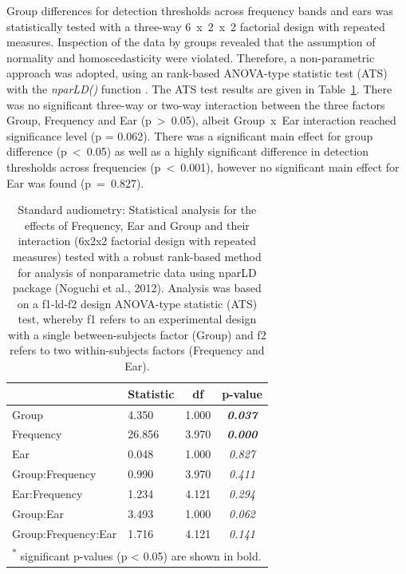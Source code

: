 \documentclass[a4paper, twoside]{templates/ociamthesis}
\begin{document}
Group differences for detection thresholds across frequency bands and ears was statistically tested with a three-way 6~x~2~x~2 factorial design with repeated measures. Inspection of the data by groups revealed that the assumption of normality and homoscedasticity were violated. Therefore, a non-parametric approach was adopted, using an rank-based ANOVA-type statistic test (ATS) with the \emph{nparLD()} function \autocite[nparLD package;][]{nparLDPackageR}. The ATS test results are given in Table~\ref{tab:RegAud-TabnparLD}. There was no significant three-way or two-way interaction between the three factors Group, Frequency and Ear (p~\textgreater~0.05), albeit Group~x~Ear interaction reached significance level (p = 0.062). There was a significant main effect for group difference (p~\textless~0.05) as well as a highly significant difference in detection thresholds across frequencies (p~\textless~0.001), however no significant main effect for Ear was found (p~=~0.827).\\

\begin{table}

\caption{\label{tab:RegAud-TabnparLD}Standard audiometry: Statistical analysis for the effects of Frequency, Ear and Group and their interaction (6x2x2 factorial design with repeated measures) tested with a robust rank-based method for analysis of nonparametric data using nparLD package (Noguchi et al., 2012). Analysis was based on a f1-ld-f2 design ANOVA-type statistic (ATS) test, whereby f1 refers to an experimental design with a single between-subjects factor (Group) and f2 refers to two within-subjects factors (Frequency and Ear).}
\centering
\begin{tabular}[t]{llc>{}c}
\toprule
  & Statistic & df & p-value\\
\midrule
Group & 4.350 & 1.000 & \em{\textbf{0.037}}\\
Frequency & 26.856 & 3.970 & \em{\textbf{0.000}}\\
Ear & 0.048 & 1.000 & \em{0.827}\\
Group:Frequency & 0.990 & 3.970 & \em{0.411}\\
Ear:Frequency & 1.234 & 4.121 & \em{0.294}\\
Group:Ear & 3.493 & 1.000 & \em{0.062}\\
Group:Frequency:Ear & 1.716 & 4.121 & \em{0.141}\\
\bottomrule
\multicolumn{4}{l}{\textsuperscript{*} significant p-values (p < 0.05) are shown in bold.}\\
\end{tabular}
\end{table}
\end{document}
